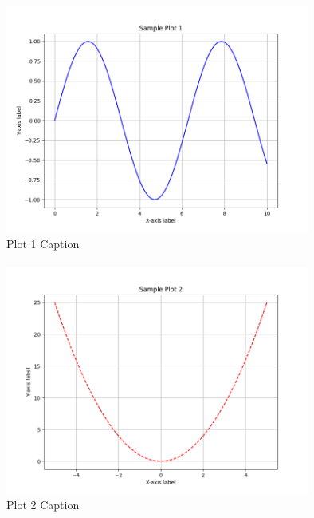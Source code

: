 \documentclass[class=book, crop=false]{standalone}
\begin{document}
\begin{figure}[htbp]
    \centering
    \includegraphics[width=10cm]{../../figures_and_plots/plots/plot1.png}
    \caption{Plot 1 Caption}
    \label{fig:plot1}
\end{figure}

\paragraph*{}
\blindmathpaper

\cite{latex2e}

\begin{figure}[htbp]
    \centering
    \includegraphics[width=10cm]{../../figures_and_plots/plots/plot2.png}
    \caption{Plot 2 Caption}
    \label{fig:plot2}
\end{figure}
\end{document}
